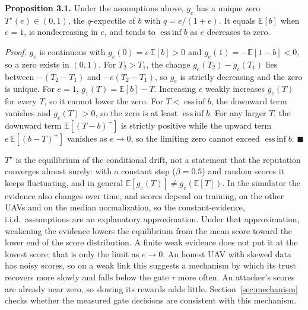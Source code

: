 \noindent\textbf{Proposition 3.1.} Under the assumptions above, $g_e$ has a unique
zero $T^\star(e)\in(0,1)$, the $q$-expectile of $b$ with $q=e/(1+e)$. It equals
$\mathbb{E}[b]$ when $e=1$, is nondecreasing in $e$, and tends to
$\operatorname{ess\,inf} b$ as $e$ decreases to zero.

\noindent\textit{Proof.} $g_e$ is continuous with $g_e(0)=e\,\mathbb{E}[b]>0$ and
$g_e(1)=-\mathbb{E}[1-b]<0$, so a zero exists in $(0,1)$. For $T_2>T_1$, the change
$g_e(T_2)-g_e(T_1)$ lies between $-(T_2-T_1)$ and $-e(T_2-T_1)$, so $g_e$ is strictly
decreasing and the zero is unique. For $e=1$, $g_1(T)=\mathbb{E}[b]-T$. Increasing $e$
weakly increases $g_e(T)$ for every $T$, so it cannot lower the zero. For
$T<\operatorname{ess\,inf}b$, the downward term vanishes and $g_e(T)>0$, so the zero
is at least $\operatorname{ess\,inf}b$. For any larger $T$, the downward term
$\mathbb{E}[(T-b)^+]$ is strictly positive while the upward term
$e\,\mathbb{E}[(b-T)^+]$ vanishes as $e\to0$, so the limiting zero cannot exceed
$\operatorname{ess\,inf}b$. \hfill$\blacksquare$

$T^\star$ is the equilibrium of the conditional drift, not a statement that the
reputation converges almost surely: with a constant step ($\beta=0.5$) and random
scores it keeps fluctuating, and in general $\mathbb{E}[g_e(T)]\neq g_e(\mathbb{E}[T])$.
In the simulator the evidence also changes over time, and scores depend on training,
on the other UAVs and on the median normalization, so the constant-evidence, i.i.d.\
assumptions are an explanatory approximation. Under that approximation, weakening the
evidence lowers the equilibrium from the mean score toward the lower end of the score
distribution. A finite weak evidence does not put it at the lowest score; that is
only the limit as $e\to0$. An honest UAV with skewed data has noisy scores, so on a
weak link this suggests a mechanism by which its trust recovers more slowly and falls
below the gate $\tau$ more often. An attacker's scores are already near zero, so
slowing its rewards adds little. Section~\ref{sec:mechanism} checks whether the
measured gate decisions are consistent with this mechanism.
